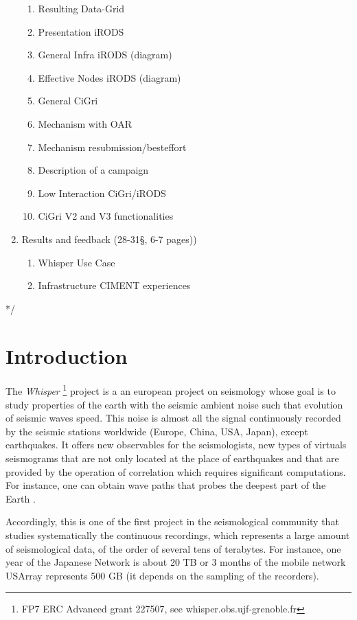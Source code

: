 \documentclass[a4paper, 10pt]{article}
\begin{document}
\begin{multicols}{2}
\begin{enumerate}
\begin{enumerate}
  	  \item Resulting Data-Grid
      \item Presentation iRODS
	  \item General Infra iRODS (diagram)
	  \item Effective Nodes iRODS (diagram)
  	  \item General CiGri
  	  \item Mechanism with OAR
  	  \item Mechanism resubmission/besteffort
  	  \item Description of a campaign
  	  \item Low Interaction CiGri/iRODS
  	  \item CiGri V2 and V3 functionalities
  	\end{enumerate}
  \item Results and feedback (28-31\S, 6-7 pages))
      \begin{enumerate}
	    \item Whisper Use Case
        \item Infrastructure CIMENT experiences
       \end{enumerate}
\end{enumerate}
*/

\newpage
\section{Introduction}%

The \emph{Whisper} \footnote{FP7 ERC Advanced grant 227507, see whisper.obs.ujf-grenoble.fr} 
project is a an european project on seismology whose goal is to study properties of the earth
with the seismic ambient noise such that evolution of seismic waves speed. 
This noise is almost all the signal continuously recorded by
the seismic stations worldwide (Europe, China, USA, Japan), except earthquakes. It offers new
observables for the seismologists, new types of virtuals seismograms that are not only located at the 
place of earthquakes and that are provided by the operation of correlation  which requires significant computations.
For instance, one can obtain wave paths that probes the deepest part of the Earth \cite{key:BPCPBR, key:PCP}.

 
Accordingly, this is one of the first project in the seismological community that studies
systematically the continuous recordings, which represents a large amount of seismological data, 
of the order of several tens of terabytes.
For instance, one year of the Japanese Network is about 20 TB or 3 months of the mobile network
USArray represents 500 GB (it depends on the sampling of the recorders).



\end{multicols}
\end{document}

